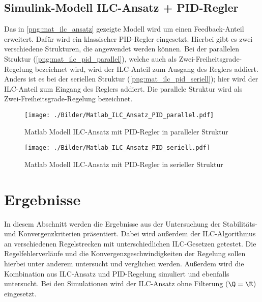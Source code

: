 \subsection{Simulink-Modell ILC-Ansatz + PID-Regler}
\label{subsec_modell_ilc_pid}
Das in \autoref{png:mat_ilc_ansatz} gezeigte Modell wird um einen Feedback-Anteil erweitert. Dafür wird ein klassischer PID-Regler eingesetzt. Hierbei gibt es zwei verschiedene Strukturen, die angewendet werden können. Bei der parallelen Struktur (\autoref{png:mat_ilc_pid_parallel}), welche auch als Zwei-Freiheitsgrade-Regelung bezeichnet wird, wird der ILC-Anteil zum Ausgang des Reglers addiert. Anders ist es bei der seriellen Struktur (\autoref{png:mat_ilc_pid_seriell}); hier wird der ILC-Anteil zum Eingang des Reglers addiert. Die parallele Struktur wird als Zwei-Freiheitsgrade-Regelung bezeichnet.
\begin{figure}[H]
	\centering
	\texttt{[image: ./Bilder/Matlab\_ILC\_Ansatz\_PID\_parallel.pdf]}
	\caption{Matlab Modell ILC-Ansatz mit PID-Regler in paralleler Struktur}
	\label{png:mat_ilc_pid_parallel}
\end{figure}
\begin{figure}[H]
	\centering
	\texttt{[image: ./Bilder/Matlab\_ILC\_Ansatz\_PID\_seriell.pdf]}
	\caption{Matlab Modell ILC-Ansatz mit PID-Regler in serieller Struktur}
	\label{png:mat_ilc_pid_seriell}
\end{figure}

\section{Ergebnisse}
In diesem Abschnitt werden die Ergebnisse aus der Untersuchung der Stabilitäts- und Konvergenzkriterien präsentiert. Dabei wird außerdem der ILC-Algorithmus an verschiedenen Regelstrecken mit unterschiedlichen ILC-Gesetzen getestet. Die Regelfehlerverläufe und die Konvergenzgeschwindigkeiten der Regelung sollen hierbei unter anderem untersucht und verglichen werden. Außerdem wird die Kombination aus ILC-Ansatz und PID-Regelung simuliert und ebenfalls untersucht. Bei den Simulationen wird der ILC-Ansatz ohne Filterung ($\Q = \E$) eingesetzt.
